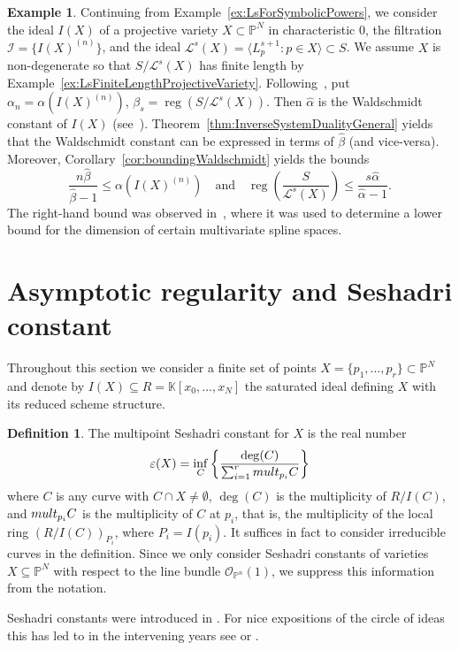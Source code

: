 \documentclass[12pt, reqno]{amsart}
\numberwithin{equation}{section}
\def\e{\ensuremath{\varepsilon}}
\newcommand{\wa}{\widehat{\alpha}}
\newcommand{\wb}{\widehat{\beta}}
\renewcommand{\P}{{\mathbb P}}
\newcommand{\kk}{\mathbb{K}}
\newcommand{\cL}{{\mathcal L}}
\newcommand{\I}{{\mathcal I}}
\DeclareMathOperator{\reg}{reg}
\theoremstyle{plain} %
\theoremstyle{definition}
\newtheorem{defn}[thm]{Definition}
\newtheorem{ex}[thm]{Example}
\theoremstyle{remark}
\begin{document}
\begin{ex}\label{ex:WaldschmidtDuality}
Continuing from Example~\ref{ex:LsForSymbolicPowers},
we consider the ideal $I(X)$ of a projective variety $X\subset \P^N$ in characteristic $0$, the filtration $\I=\{I(X)^{(n)}\}$, and the ideal $\cL^s(X)=\langle L_p^{s+1}: p\in X\rangle\subset S$.  We assume $X$ is non-degenerate so that $S/\cL^s(X)$ has finite length by Example~\ref{ex:LsFiniteLengthProjectiveVariety}. Following~, put $\alpha_n=\alpha(I(X)^{(n)})$, $\beta_s=\reg(S/\cL^s(X))$.  Then $\wa$ is the Waldschmidt constant of $I(X)$ (see~).  Theorem~\ref{thm:InverseSystemDualityGeneral} yields that the Waldschmidt constant can be expressed in terms of $\wb$ (and vice-versa).  Moreover, Corollary~\ref{cor:boundingWaldschmidt} yields the bounds
\[
\frac{n\wb}{\wb-1}\le \alpha(I(X)^{(n)}) \quad\mbox{and}\quad \reg\left(\frac{S}{\cL^s(X)}\right)\le \frac{s\wa}{\wa-1}.
\]
The right-hand bound was observed in~\cite{DiPVill21}, where it was used to determine a lower bound for the dimension of certain multivariate spline spaces.
\end{ex}

\section{Asymptotic regularity and Seshadri constant}

Throughout this section we consider  a finite set of points  $X=\{p_1,\ldots,p_r\}\subset \mathbb{P}^N$ and denote by $I(X)\subseteq R=\kk[x_0,\ldots,x_N]$ the saturated ideal defining $X$ with its reduced scheme structure.
\begin{defn}
\label{def:Seshadri}
The  multipoint Seshadri constant for $X$ is the real number
\[
\e(X)= \inf_C\left\{ \frac{\deg(C)}{ \sum_{i=1}^r {\rm mult}_{p_i} C} \right\} 
\]
where $C$ is any curve with $C\cap X\neq \emptyset$, $\deg(C)$ is the multiplicity of $R/I(C)$, and ${\rm mult}_{p_i} C$ is the multiplicity of $C$ at $p_i$, that is, the multiplicity of the local ring $(R/I(C))_{P_i}$, where $P_i=I(p_i)$. It suffices in fact to consider irreducible curves in the definition. Since we only consider Seshadri constants of varieties $X\subseteq \P^N$ with respect to the line bundle $ \mathcal{O}_{\P^n}(1)$, we suppress  this information from the notation.
\end{defn}

Seshadri constants were introduced in \cite{Demailly}. For nice expositions of the circle of ideas this has led to in the intervening years see \cite[\S 5.1]{Laz04} or \cite{primer}.
\end{document}
